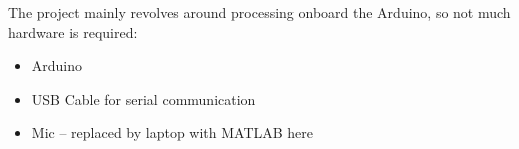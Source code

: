 The project mainly revolves around processing onboard the Arduino, so not much hardware is required:

\begin{itemize}
    \item Arduino
    \item USB Cable for serial communication
    \item Mic -- replaced by laptop with MATLAB here
\end{itemize}